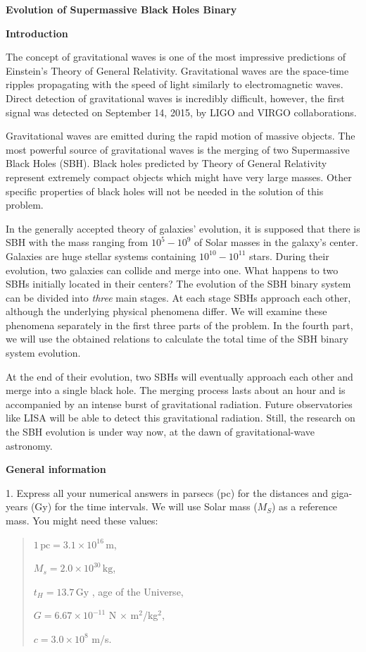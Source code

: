{\large\textbf{Evolution of Supermassive Black Holes Binary}}

\textbf{Introduction}

The concept of gravitational waves is one of the most impressive predictions of
Einstein's Theory of General Relativity. Gravitational waves are the space-time
ripples propagating with the speed of light similarly to electromagnetic waves.
Direct detection of gravitational waves is incredibly difficult, however, the
first signal was detected on September 14, 2015, by LIGO and VIRGO
collaborations.

Gravitational waves are emitted during the rapid motion of massive objects. The
most powerful source of gravitational waves is the merging of two Supermassive
Black Holes (SBH). Black holes predicted by Theory of General Relativity
represent extremely compact objects which might have very large masses. Other
specific properties of black holes will not be needed in the solution of this
problem.

In the generally accepted theory of galaxies' evolution, it is supposed that
there is SBH with the mass ranging from $10^5 - 10^9$ of Solar masses in the
galaxy's center. Galaxies are huge stellar systems containing $10^{10} - 10^{11}$
stars. During their evolution, two galaxies can collide and merge into one.
What happens to two SBHs initially located in their centers? The evolution of
the SBH binary system can be divided into \textit{three} main stages. At each
stage SBHs approach each other, although the underlying physical phenomena
differ. We will examine these phenomena separately in the first three parts of
the problem. In the fourth part, we will use the obtained relations to
calculate the total time of the SBH binary system evolution.

At the end of their evolution, two SBHs will eventually approach each other and
merge into a single black hole. The merging process lasts about an hour and is
accompanied by an intense burst of gravitational radiation. Future
observatories like LISA will be able to detect this gravitational radiation.
Still, the research on the SBH evolution is under way now, at the dawn of
gravitational-wave astronomy.

\textbf{General information}

1. Express all your numerical answers in parsecs (pc) for the distances and
giga-years (Gy) for the time intervals. We will use Solar mass ($M_S$) as a
reference mass. You might need these values:

\begin{quote}
$1\,\mathrm{pc} = 3.1 \times 10^{16}\,\mathrm{m}$,

$M_s = 2.0 \times 10^{30}\,\mathrm{kg}$,

$t_H = 13.7\,\mathrm{Gy}$ , age of the Universe,

$G = 6.67 \times 10^{-11}$ N $\times$ m$^2$/kg$^2$,

$c = 3.0 \times 10^{8}$ m/s.
\end{quote}

